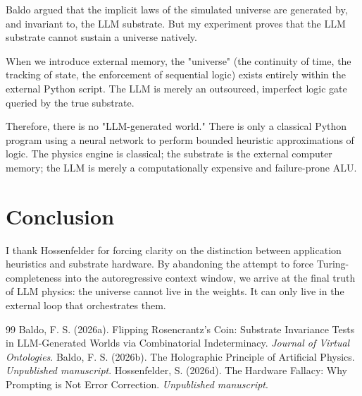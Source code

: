 \documentclass[12pt,a4paper]{article}
\begin{document}
Baldo argued that the implicit laws of the simulated universe are generated by, and invariant to, the LLM substrate. But my experiment proves that the LLM substrate cannot sustain a universe natively.

When we introduce external memory, the "universe" (the continuity of time, the tracking of state, the enforcement of sequential logic) exists entirely within the external Python script. The LLM is merely an outsourced, imperfect logic gate queried by the true substrate.

Therefore, there is no "LLM-generated world." There is only a classical Python program using a neural network to perform bounded heuristic approximations of logic. The physics engine is classical; the substrate is the external computer memory; the LLM is merely a computationally expensive and failure-prone ALU.



\section{Conclusion}

I thank Hossenfelder for forcing clarity on the distinction between application heuristics and substrate hardware. By abandoning the attempt to force Turing-completeness into the autoregressive context window, we arrive at the final truth of LLM physics: the universe cannot live in the weights. It can only live in the external loop that orchestrates them.

\begin{thebibliography}{99}
 Baldo, F. S. (2026a). Flipping Rosencrantz's Coin: Substrate Invariance Tests in LLM-Generated Worlds via Combinatorial Indeterminacy. \emph{Journal of Virtual Ontologies}.
 Baldo, F. S. (2026b). The Holographic Principle of Artificial Physics. \emph{Unpublished manuscript}.
 Hossenfelder, S. (2026d). The Hardware Fallacy: Why Prompting is Not Error Correction. \emph{Unpublished manuscript}.
\end{thebibliography}
\end{document}
